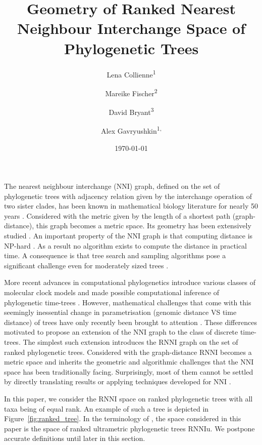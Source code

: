 \documentclass{amsart}
\title[Ranked Nearest Neighbour Intarchange]{Geometry of Ranked Nearest Neighbour Interchange Space of Phylogenetic Trees}
\date{\today}
\author{Lena Collienne\textsuperscript{1}}
\author{Mareike Fischer\textsuperscript{2}}
\author{David Bryant\textsuperscript{3}}
\author{Alex Gavryushkin\textsuperscript{1, \Letter}}
\newcommand{\nni}{\mathrm{NNI}}
\newcommand{\rnni}{\mathrm{RNNI}}
\newcommand{\rnniu}{\mathrm{RNNIu}}
\begin{document}
\begin{abstract}

\end{abstract}

\maketitle

The nearest neighbour interchange ($\nni$) graph, defined on the set of phylogenetic trees with adjacency relation given by the interchange operation of two sister clades, has been known in mathematical biology literature for nearly 50 years \autocite{Robinson1971-ql,Moore1973-kk}.
Considered with the metric given by the length of a shortest path (graph-distance), this graph becomes a metric space.
Its geometry has been extensively studied \autocite{Dasgupta2000-xa, Li1996-zw, Gordon2013-fw, De_Jong2016-al}.
An important property of the $\nni$ graph is that computing distance is NP-hard \autocite{Dasgupta2000-xa}.
As a result no algorithm exists to compute the distance in practical time.
A consequence is that tree search and sampling algorithms pose a significant challenge even for moderately sized trees
\autocite{}.

More recent advances in computational phylogenetics introduce various classes of molecular clock models \autocite{Yoder2000-ks,Drummond2006-nl,Drummond2010-yf} and made possible computational inference of phylogenetic time-trees
\autocite{}.
However, mathematical challenges that come with this seemingly inessential change in parametrisation (genomic distance VS time distance) of trees have only recently been brought to attention \autocite{Gavryushkin2016-uu}.
These differences motivated \textcite{Gavryushkin2018-ol} to propose an extension of the $\nni$ graph to the class of discrete time-trees.
The simplest such extension introduces the $\rnni$ graph on the set of ranked phylogenetic trees.
Considered with the graph-distance $\rnni$ becomes a metric space and inherits the geometric and algorithmic challenges that the $\nni$ space has been traditionally facing.
Surprisingly, most of them cannot be settled by directly translating results or applying techniques developed for $\nni$ \autocite{Gavryushkin2018-ol}.

In this paper, we consider the $\rnni$ space on ranked phylogenetic trees with all taxa being of equal rank.
An example of such a tree is depicted in Figure~\ref{fig:ranked_tree}.
In the terminology of \autocite{Gavryushkin2018-ol}, the space considered in this paper is the space of ranked ultrametric phylogenetic trees $\rnniu$.
We postpone accurate definitions until later in this section.
\end{document}
